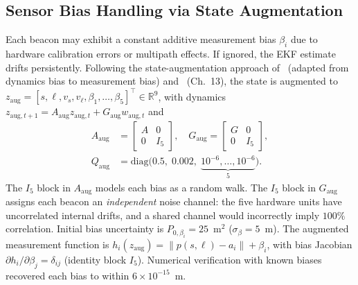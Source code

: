 \documentclass[11pt,a4paper]{article}
\begin{document}
\subsection{Sensor Bias Handling via State Augmentation}
\label{sec:bias}
Each beacon may exhibit a constant additive measurement bias $\beta_i$
due to hardware calibration errors or multipath effects. If ignored,
the EKF estimate drifts persistently. Following the
state-augmentation approach of~\cite{KalmanVI,Sopasakis_4_kalman_variants}
(adapted from dynamics bias to measurement bias) and~\cite{Simon2006}
(Ch.~13), the state
is augmented to $z_\text{aug}=[s,\ell,v_s,v_\ell,\beta_1,\dots,\beta_5]
^{\!\top}\in\mathbb{R}^9$, with dynamics
$z_{\text{aug},t+1}=A_\text{aug}z_{\text{aug},t}+G_\text{aug}
w_{\text{aug},t}$ and
\begin{equation}
\begin{aligned}
A_\text{aug}&=\begin{bmatrix}A&0\\0&I_5\end{bmatrix},\quad
G_\text{aug}=\begin{bmatrix}G&0\\0&I_5\end{bmatrix},\\[2pt]
Q_\text{aug}&=\mathrm{diag}\bigl(0.5,\;0.002,\;
\underbrace{10^{-6},\dots,10^{-6}}_{5}\bigr).
\end{aligned}
\label{eq:aug}
\end{equation}
The $I_5$ block in $A_\text{aug}$ models each bias as a random walk.
The $I_5$ block in $G_\text{aug}$ assigns each beacon an
\emph{independent} noise channel: the five hardware units have
uncorrelated internal drifts, and a shared channel would incorrectly
imply $100\%$ correlation. Initial bias uncertainty is
$P_{0,\beta_i}=25$~m$^2$ ($\sigma_\beta=5$~m). The augmented measurement
function is $h_i(z_\text{aug})=\|p(s,\ell)-a_i\|+\beta_i$, with bias
Jacobian $\partial h_i/\partial \beta_j=\delta_{ij}$ (identity block
$I_5$). Numerical verification with known biases recovered each
bias to within $6\times10^{-15}$~m.
\end{document}
